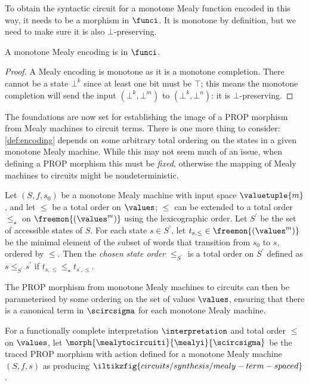\documentclass{lmcs}
\begin{document}
To obtain the syntactic circuit for a monotone Mealy function encoded
in this way, it needs to be a morphism in \(\funci\).
It is monotone by definition, but we need to make sure it is also
\(\bot\)-preserving.

\begin{lem}
    A monotone Mealy encoding is in \(\funci\).
\end{lem}
\begin{proof}
    A Mealy encoding is monotone as it is a monotone completion.
    There cannot be a state \(\bot^k\) since at least one bit must
    be \(\top\); this means the monotone completion will send the input
    \((\bot^k, \bot^m)\) to \((\bot^k, \bot^n)\): it is
    \(\bot\)-preserving.
\end{proof}

The foundations are now set for establishing the image of a PROP morphism from
Mealy machines to circuit terms.
There is one more thing to consider: \autoref{def:encoding} depends on some
arbitrary total ordering on the states in a given monotone Mealy machine.
While this may not seem much of an issue, when
defining a PROP morphism this must be \emph{fixed}, otherwise the mapping of
Mealy machines to circuits might be nondeterministic.

\begin{defi}
    Let \((S, f, s_0)\) be a monotone Mealy machine with input space
    \(\valuetuple{m}\), and let \(\leq\) be a total order on \(\values\);
    \(\leq\) can be extended to a total order \(\leq_\star\) on
    \(\freemon{(\values^m)}\) using the lexicographic order.
    Let \(S^\prime\) be the set of accessible states of \(S\).
    For each state \(s \in S^\prime\), let
    \(t_{s,\leq} \in \freemon{(\values^m)}\) be the minimal element of the
    subset of words that transition from \(s_0\) to \(s\), ordered by \(\leq\).
    Then the \emph{chosen state order} \(\leq_{S^\prime}\) is a total order on
    \(S^\prime\) defined as \(s \leq_{S^\prime} s^\prime\) if
    \(t_{s,\leq} \leq_\star t_{s^\prime,\leq}\).
\end{defi}

The PROP morphism from monotone Mealy machines to circuits can then be
parameterised by some ordering on the set of values \(\values\), ensuring that
there is a canonical term in \(\scircsigma\) for each monotone Mealy machine.

\begin{defi}\label{def:mealy-to-circuit}
    For a functionally complete interpretation \(\interpretation\) and total
    order \(\leq\) on \(\values\), let \(
    \morph{
        \mealytocircuiti
    }{
        \mealyi
    }{
        \scircsigma
    }
    \) be the traced PROP morphism with action defined for a monotone Mealy
    machine \((S,f,s)\) as producing \(
    \iltikzfig{circuits/synthesis/mealy-term-spaced}
    \).
\end{defi}
\end{document}
